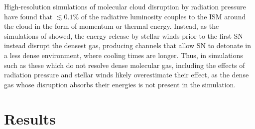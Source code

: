 High-resolution simulations of molecular cloud
disruption by radiation pressure \citep{Dale2005,Gendelev2012,Walch2012} have
found that $\lesssim 0.1\%$ of the radiative luminosity couples to the ISM around
the cloud in the form of momentum or thermal energy.  Instead, as the
simulations of \citet{Rogers2013} showed, the energy release by stellar winds
prior to the first SN instead disrupt the densest gas,
producing channels that allow SN to detonate in a less dense environment, where
cooling times are longer.  Thus, in simulations such as these which do not
resolve dense molecular gas, including the effects of radiation pressure and
stellar winds likely overestimate their effect, as the dense gas 
whose disruption absorbs their energies is not present in the simulation.

\section{Results}



